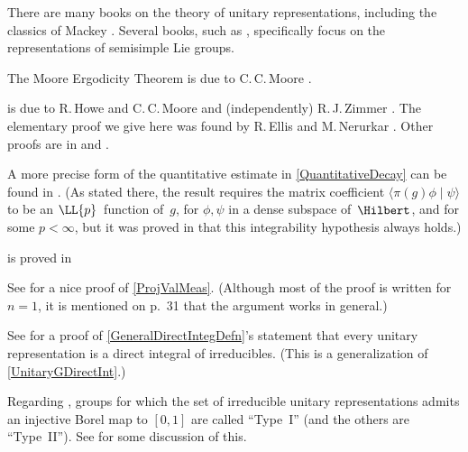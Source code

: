 \begin{notes}

There are many books on the theory of unitary representations, including the classics of Mackey \cite{Mackey-ThyUnitaryGrpReps,Mackey-UnitaryRepsPhysProbNT}. Several books, such as \cite{Knapp-RepThySSGrps}, specifically focus on the representations of semisimple Lie groups.

The Moore Ergodicity Theorem  is due to C.\,C.\,Moore \cite{Moore-ergodicity}. 

 is due to R.\,Howe and C.\,C.\,Moore
\cite[Thm.~5.1]{HoweMoore} and (independently) R.\,J.\,Zimmer
\cite[Thm.~5.2]{Zimmer-orbitspace}. 
The elementary proof we give here was found by
R.\,Ellis and M.\,Nerurkar \cite{EllisNerurkar}.
Other proofs are in \cite[\S2.3, pp.~85--92]{MargulisBook} and \cite[\S2.4, pp.~28--31]{ZimmerBook}.

A more precise form of the quantitative estimate in \cref{QuantitativeDecay} can be found in \cite[Cor.~7.2]{Howe-rank}.
(As stated there, the result requires the matrix coefficient $\langle \pi(g)\phi \mid \psi \rangle$ to be an $\LL{p}$~function of~$g$, for $\phi,\psi$ in a dense subspace of~$\Hilbert$, and for some $p < \infty$, but it was proved in \cite[Thm.~2.4.2]{Cowling-coeffs} that this integrability hypothesis always holds.)

 is proved in \cite[Chap.~3]{Sepanski-CpctLieGrps}

See \cite[Chap.~2]{Helson-SpectralThm} for a nice proof of \cref{ProjValMeas}. (Although most of the proof is written for $n = 1$, it is mentioned on p.~31 that the argument works in general.) 

See \cite[Thm.~2.9, p.~108]{Mackey-ThyUnitaryGrpReps} for a proof of \cref{GeneralDirectIntegDefn}'s statement that every unitary representation is a direct integral of irreducibles. (This is a generalization of \cref{UnitaryGDirectInt}.)

Regarding , groups for which the set of irreducible unitary representations admits an injective Borel map to $[0,1]$ are called ``Type~I'' (and the others are ``Type~II''). See \cite[\S2.3, pp.~77--85]{Mackey-ThyUnitaryGrpReps} for some discussion of this.

\end{notes}


